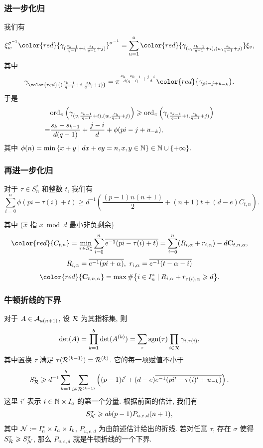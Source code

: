 \documentclass[aspectratio=169,handout]{ctexbeamer}
\begin{document}
\begin{frame}
\frametitle{进一步化归}
我们有
\vspace{-2mm}
	\[\xi_w^{\sigma^{-1}}{\color{red}{\gamma_{(\frac{s_{k-1}}{q-1}+i,\frac{s_k}{q-1}+j)}}}^{\sigma^{-1}}=\sum_{u=1}^a {\color{red}{\gamma_{(v,\frac{s_{k-1}}{q-1}+i),(w,\frac{s_k}{q-1}+j)}}}\xi_v,\]
\vspace{-2mm}
其中
\vspace{-2mm}
	\[\gamma_{\color{red}{(\frac{s_{k-1}}{q-1}+i,\frac{s_k}{q-1}+j)}}
	=\pi^{\frac{s_k-s_{k-1}}{d(q-1)}+\frac{j-i}{d}}{\color{red}{\gamma_{pi-j+u_{-k}}}}.\]
于是
	\[
	\begin{split}
	&{\mathrm{ord}}_\pi\left(\gamma_{(v,\frac{s_{k-1}}{q-1}+i),(w,\frac{s_k}{q-1}+j)}\right)\geqslant {\mathrm{ord}}_\pi\left(\gamma_{(\frac{s_{k-1}}{q-1}+i,\frac{s_k}{q-1}+j)}\right)\\
	=&\frac{s_k-s_{k-1}}{d(q-1)}+\frac{j-i}{d}+\phi(pi-j+u_{-k}),
	\end{split}
	\]
其中 $\phi(n)=\min{\left\{x+y\mid dx+ey=n,x,y\in{\mathbb{N}}\right\}}\in{\mathbb{N}}\cup{\left\{+\infty\right\}}.$
\end{frame}

\begin{frame}
\frametitle{再进一步化归}

\begin{lemma}[主子式赋值]
对于 $\tau\in S_n^*$ 和整数 $t$, 我们有
	\[\sum_{i=0}^n \phi(pi-\tau(i)+t)\ge d^{-1}\left(\frac{(p-1)n(n+1)}2+(n+1)t+(d-e)C_{t,n}\right).\]
\end{lemma}
其中 ($\overline x$ 指 $x\bmod d$ 最小非负剩余)
	\[{\color{red}{C_{t,n}}}=\min_{\tau\in S_n^*} \sum_{i=0}^n \ov{e^{-1}(pi-\tau(i)+t)}=\sum_{i=0}^n(R_{i,\alpha}+r_{i,\alpha})-d \bfC_{t,n,\alpha},\]
	\[R_{i,\alpha}=\ov{e^{-1}(pi+\alpha)},\ r_{i,\alpha}=\ov{e^{-1}(t-\alpha-i)}\]
	\[{\color{red}{\bfC_{t,n,\alpha}}}=\max\#\set{i\in I_n^*\mid R_{i,\alpha}+r_{\tau(i),\alpha}\ge d}.\]
\end{frame}


\begin{frame}
\frametitle{牛顿折线的下界}
对于 $A\in{\mathcal{A}}_{a(n+1)}$, 设 ${\mathcal{R}}$ 为其指标集, 则
	\vspace{-2mm}
	\[\det(A)=\prod_{k=1}^b\det(A^{(k)})=\sum_{\tau}\operatorname{sgn}(\tau)\prod_{i\in{\mathcal{R}}}\gamma_{i,\tau(i)},\]
	\vspace{-2mm}
其中置换 $\tau$ 满足 $\tau({\mathcal{R}}^{(k-1)})={\mathcal{R}}^{(k)}$.
它的每一项赋值不小于
	\vspace{-2mm}
		\[S_{\mathcal{R}}^\tau\geqslant d^{-1}\sum_{k=1}^b\sum_{i\in{\mathcal{R}}^{(k-1)}}\left((p-1)i'+(d-e)\overline{e^{-1}(pi'-\tau(i)'+u_{-k})}\right).\]
这里 $i'$ 表示 $i\in{\mathbb{N}}\times I_a$ 的第一个分量.
根据前面的估计, 我们有
	\vspace{-2mm}
	\[S_{\mathcal{N}}^\sigma\geqslant ab(p-1)P_{u,e,d}(n+1),\]
其中 ${\mathcal{N}}:=I_n^*\times I_a\times I_b$, $P_{u,e,d}$ 为由前述估计给出的折线.
若对任意 $\tau$, 存在 $\sigma$ 使得 $S_{\mathcal{R}}^\tau\geqslant S_{\mathcal{N}}^\sigma$, 那么 $P_{u,e,d}$ 就是牛顿折线的一个下界.
\end{frame}
\end{document}
